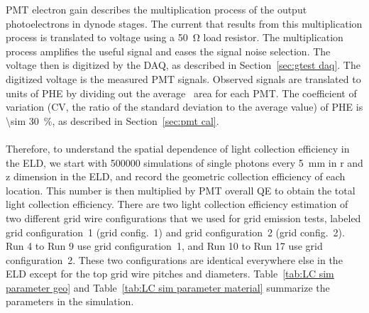 PMT electron gain describes the multiplication process of the output photoelectrons in dynode stages. The current that results from this multiplication process is translated to voltage using a \SI{50}{\ohm} load resistor. The multiplication process amplifies the useful signal and eases the signal noise selection. The voltage then is digitized by the DAQ, as described in Section~\ref{sec:gtest daq}. The digitized voltage is the measured PMT signals. Observed signals are translated to units of PHE by dividing out the average \sphe\ area for each PMT. %
The coefficient of variation (CV, the ratio of the standard deviation to the average value) of PHE is \SI{\sim 30}{\percent}, as described in Section~\ref{sec:pmt cal}. 

\paragraph{}
Therefore, to understand the spatial dependence of light collection efficiency in the ELD, we start with \num{500000} simulations of single photons every \SI{5}{mm} in r and z dimension in the ELD, and record the geometric collection efficiency of each location. This number is then multiplied by PMT overall QE to obtain the total light collection efficiency. There are two light collection efficiency estimation of two different grid wire configurations that we used for grid emission tests, labeled grid configuration~1 (grid config.~1) and grid configuration~2 (grid config.~2). Run 4 to Run 9 use grid configuration~1, and Run 10 to Run 17 use grid configuration~2. These two configurations are identical everywhere else in the ELD except for the top grid wire pitches and diameters. Table~\ref{tab:LC sim parameter geo} and Table~\ref{tab:LC sim parameter material} summarize the parameters in the simulation.


